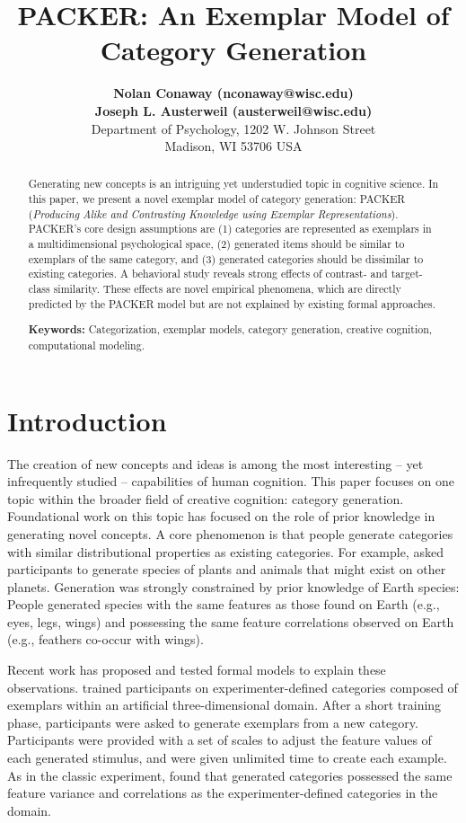 \documentclass[10pt,letterpaper]{article}
\title{PACKER: An Exemplar Model of Category Generation}
\author{
{ \large \bf Nolan Conaway (nconaway@wisc.edu) } \\
{ \large \bf Joseph L. Austerweil (austerweil@wisc.edu) } \\
Department of Psychology, 1202 W. Johnson Street \\
Madison, WI 53706 USA
}
\begin{document}
\maketitle

\begin{abstract}

Generating new concepts is an intriguing yet understudied topic in cognitive science. In this paper, we present a novel exemplar model of category generation: PACKER (\textit{Producing Alike and Contrasting Knowledge using Exemplar Representations}). PACKER's core design assumptions are (1) categories are represented as exemplars in a multidimensional psychological space, (2) generated items should be similar to exemplars of the same category, and (3) generated categories should be dissimilar to existing categories. A behavioral study reveals strong effects of contrast- and target-class similarity. These effects are novel empirical phenomena, which are directly predicted by the PACKER model but are not explained by existing formal approaches. 

\textbf{Keywords:} 
Categorization, exemplar models, category generation, creative cognition, computational modeling.
\end{abstract}

\section{Introduction}

The creation of new concepts and ideas is among the most interesting -- yet infrequently studied -- capabilities of human cognition. This paper focuses on one topic within the broader field of creative cognition: category generation. Foundational work on this topic \citep[e.g.,][]{smith1993constraining,ward2002role,ward1994structured,ward1995s} has focused on the role of prior knowledge in generating novel concepts. A core phenomenon is that people generate categories with similar distributional properties as existing categories. For example, \citet{ward1994structured} asked participants to generate species of plants and animals that might exist on other planets. Generation was strongly constrained by prior knowledge of Earth species: People generated species with the same features as those found on Earth (e.g., eyes, legs, wings) and possessing the same feature correlations observed on Earth (e.g., feathers co-occur with wings). 

Recent work has proposed and tested formal models to explain these observations. \citet{jern2013probabilistic} trained participants on experimenter-defined categories composed of exemplars within an artificial three-dimensional domain. After a short training phase, participants were asked to generate exemplars from a new category. Participants were provided with a set of scales to adjust the feature values of each generated stimulus, and were given unlimited time to create each example. As in the classic \cite{ward1994structured} experiment, \citet{jern2013probabilistic} found that generated categories possessed the same feature variance and correlations as the experimenter-defined categories in the domain. 
\end{document}
